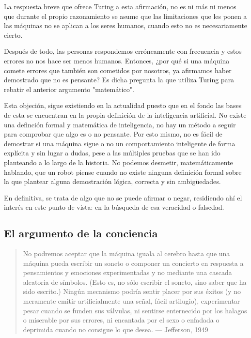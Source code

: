 \documentclass[12pt,a4paper]{article}
\begin{document}
La respuesta breve que ofrece Turing a esta afirmación, no es ni más ni menos que durante el propio razonamiento se asume que las limitaciones que les ponen a las máquinas no se aplican a los seres humanos, cuando esto no es necesariamente cierto.

Después de todo, las personas respondemos erróneamente con frecuencia y estos errores no nos hace ser menos humanos. Entonces, ¿por qué si una máquina comete errores que también son cometidos por nosotros, ya afirmamos haber demostrado que no es pensante? Es dicha pregunta la que utiliza Turing para rebatir el anterior argumento "matemático".

Esta objeción, sigue existiendo en la actualidad puesto que en el fondo las bases de esta se encuentran en la propia definición de la inteligencia artificial. No existe una definción formal y matemática de inteligencia, no hay un método a seguir para comprobar que algo es o no pensante. Por esto mismo, no es fácil de demostrar si una máquina sigue o no un comportamiento inteligente de forma explícita y sin lugar a dudas, pese a las múltiples pruebas que se han ido planteando a lo largo de la historia. No podemos desmetir, matemáticamente hablando, que un robot piense cuando no existe ninguna definición formal sobre la que plantear alguna demostración lógica, correcta y sin ambigüedades.

En definitiva, se trata de algo que no se puede afirmar o negar, residiendo ahí el interés en este punto de vista: en la búsqueda de esa veracidad o falsedad.


\subsection{El argumento de la conciencia}
\begin{quote}\small No podremos aceptar que la máquina iguala al cerebro hasta que una máquina pueda escribir un soneto o componer un concierto en respuesta a pensamientos y emociones experimentadas y no mediante una cascada aleatoria de símbolos. (Esto es, no sólo escribir el soneto, sino saber que ha sido escrito.) Ningún mecanismo podría sentir placer por sus éxitos (y no meramente emitir artificialmente una señal, fácil artilugio), experimentar pesar cuando se funden sus válvulas, ni sentirse enternecido por los halagos o miserable por sus errores, ni encantada por el sexo o enfadada o deprimida cuando no consigue lo que desea. — Jefferson, 1949\end{quote}
\end{document}
